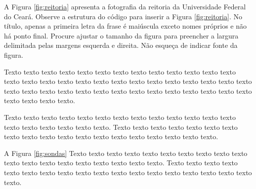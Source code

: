     A Figura \ref{fig:reitoria} apresenta a fotografia da reitoria da Universidade Federal do Ceará. Observe a estrutura do código para inserir a Figura \ref{fig:reitoria}. No título, apenas a primeira letra da frase é maiúscula  exceto nomes próprios e não há ponto final. Procure ajustar o tamanho da figura para preencher a largura delimitada pelas margens esquerda e direita. Não esqueça de indicar fonte da figura. 
    
   	\begin{figure}[h!]
	\end{figure}
	
    Texto texto texto texto texto texto texto texto texto texto texto texto texto texto texto texto texto texto texto texto texto texto texto texto texto texto texto texto texto texto texto texto texto texto texto texto texto texto texto texto texto texto texto texto texto.

    Texto texto texto texto texto texto texto texto texto texto texto texto texto texto texto texto texto texto texto. Texto texto texto texto texto texto texto texto texto texto texto texto texto texto texto texto texto texto texto.

    A Figura \ref{fig:sondas} Texto texto texto texto texto texto texto texto texto texto texto texto texto texto texto texto texto texto texto. Texto texto texto texto texto texto texto texto texto texto texto texto texto texto texto texto texto texto texto.

